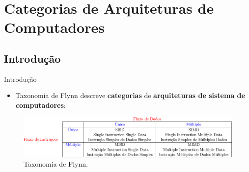 



\section{Categorias de Arquiteturas de Computadores}
	\subsection{Introdução}
\begin{frame}{Introdução}
	\begin{itemize}
	\item Taxonomia de Flynn descreve \textbf{categorias} de \textbf{arquiteturas de sistema de computadores}:
	\end{itemize}

	\begin{figure}[h]
		\centering
		\includegraphics[width=1\textwidth]{img/tobias/taxonomia.png}
		\caption{Taxonomia de Flynn.}
		\label{fig:taxonomia}
	\end{figure}

\end{frame}

%		
%                
%                







